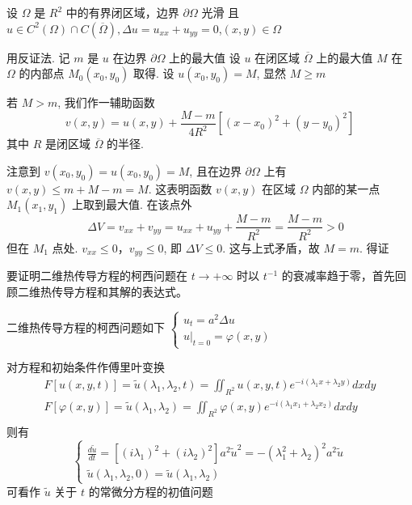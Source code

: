 \begin{questions}
\begin{solution}
    设 $\Omega$ 是 $ R^{2} $ 中的有界闭区域，边界 $ \partial \Omega $ 光滑 且 $ u \in C^{2}(\Omega) \cap C(\overline{\Omega}), \Delta u=u_{x x}+u_{y y}=0$,$(x, y) \in \Omega $

用反证法. 记 $m$ 是 $u$ 在边界 $ \partial \Omega $ 上的最大值 设 $u$ 在闭区域 $ \overline{\Omega} $ 上的最大值 $ M $ 在 $ \Omega $ 的内部点 $ M_{0}\left(x_{0}, y_{0}\right) $ 取得.  设 $ u\left(x_{0}, y_{0}\right)=M $, 显然 $ M \geqslant m $

若 $M > m$, 我们作一辅助函数
$$
v(x, y)=u(x, y)+\frac{M-m}{4 R^{2}}\left[\left(x-x_{0}\right)^{2}+\left(y-y_{0}\right)^{2}\right]
$$
其中 $ R $ 是闭区域 $\overline{\Omega}$ 的半径.

注意到 $ v\left(x_{0}, y_{0}\right)=u\left(x_{0}, y_{0}\right)=M $,
且在边界 $ \partial \Omega $ 上有 $ v(x, y) \leqslant m+M-m=M $.
这表明函数 $ v(x, y) $ 在区域 $ \Omega $ 内部的某一点 $ M_{1}\left(x_{1}, y_{1}\right) $ 上取到最大值.
在该点外 
$$ \quad \Delta V=v_{x x}+v_{y y}=u_{x x}+u_{y y}+\frac{M-m}{R^{2}}=\frac{M-m}{R^{2}}>0 $$
但在 $ M_{1} $ 点处. $ v_{x x} \leqslant 0 ， v_{y y} \leqslant 0 $, 即 $ \Delta V \leqslant 0 $.
这与上式矛盾，故 $ M=m $. 得证
\end{solution}


\begin{solution}
    要证明二维热传导方程的柯西问题在 $ t \rightarrow +\infty $ 时以 $ t^{-1} $ 的衰减率趋于零，首先回顾二维热传导方程和其解的表达式。

二维热传导方程的柯西问题如下
$\left\{\begin{array}{l}
u_{t}=a^{2} \Delta u \\
\left.u\right|_{t=0}=\varphi(x, y)
\end{array}\right.$

对方程和初始条件作傅里叶变换
$$
\begin{array}{l}
F[u(x, y, t)]=\tilde{u}\left(\lambda_{1}, \lambda_{2}, t\right)=\iint_{R^{2}} u(x, y, t) e^{-i\left(\lambda_{1} x+\lambda_{2} y\right)} d x d y \\
F[\varphi(x, y)]=\tilde{u}\left(\lambda_{1}, \lambda_{2}\right)=\iint_{R^{2}} \varphi(x, y) e^{-i\left(\lambda_{1} x_{1}+\lambda_{2} x_{2}\right)} d x d y \\
\end{array}
$$
则有
$$
\left\{\begin{array}{l}
\frac{d \tilde{u}}{d t}=\left[\left(i \lambda_{1}\right)^{2}+\left(i \lambda_{2}\right)^{2}\right] a^{2} \tilde{u}^{2}=-\left(\lambda_{1}^{2}+\lambda_{2}\right)^{2} a^{2} \tilde{u} \\
\tilde{u}\left(\lambda_{1}, \lambda_{2}, 0\right)=\tilde{u}\left(\lambda_{1}, \lambda_{2}\right)
\end{array}\right.
$$
可看作 $\tilde u$ 关于 $t$ 的常微分方程的初值问题


\end{solution}
\end{questions}
